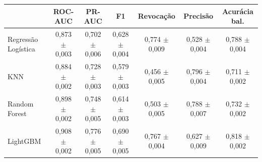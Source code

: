 \begin{tabular}{lcccccc}
\toprule
 & ROC-AUC & PR-AUC & F1 & Revocação & Precisão & Acurácia bal. \\
\midrule
Regressão Logística & 0,873 $\pm$ 0,003 & 0,702 $\pm$ 0,006 & 0,628 $\pm$ 0,004 & 0,774 $\pm$ 0,009 & 0,528 $\pm$ 0,004 & 0,788 $\pm$ 0,004 \\
KNN & 0,884 $\pm$ 0,002 & 0,728 $\pm$ 0,003 & 0,579 $\pm$ 0,003 & 0,456 $\pm$ 0,005 & 0,796 $\pm$ 0,004 & 0,711 $\pm$ 0,002 \\
Random Forest & 0,898 $\pm$ 0,002 & 0,748 $\pm$ 0,005 & 0,614 $\pm$ 0,003 & 0,503 $\pm$ 0,005 & 0,788 $\pm$ 0,007 & 0,732 $\pm$ 0,002 \\
LightGBM & 0,908 $\pm$ 0,002 & 0,776 $\pm$ 0,005 & 0,690 $\pm$ 0,005 & 0,767 $\pm$ 0,004 & 0,627 $\pm$ 0,009 & 0,818 $\pm$ 0,002 \\
\bottomrule
\end{tabular}
